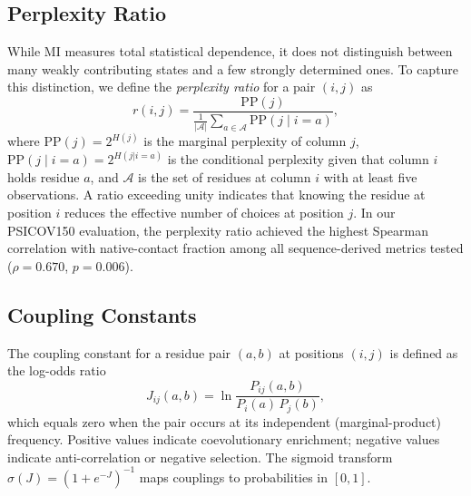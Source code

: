 \subsection{Perplexity Ratio}
\label{sec:perplexity}

While MI measures total statistical dependence, it does not distinguish between
many weakly contributing states and a few strongly determined ones.  To capture
this distinction, we define the \emph{perplexity ratio} for a pair $(i,j)$ as
\begin{equation}
	r(i,j) = \frac{\mathrm{PP}(j)}
	{\frac{1}{|\mathcal{A}|}\sum_{a \in \mathcal{A}}
		\mathrm{PP}(j \mid i = a)},
	\label{eq:pp-ratio}
\end{equation}
where $\mathrm{PP}(j) = 2^{H(j)}$ is the marginal perplexity of column $j$,
$\mathrm{PP}(j \mid i = a) = 2^{H(j|i=a)}$ is the conditional perplexity given
that column $i$ holds residue $a$, and $\mathcal{A}$ is the set of residues at
column $i$ with at least five observations.  A ratio exceeding unity indicates
that knowing the residue at position $i$ reduces the effective number of
choices at position $j$.  In our PSICOV150 evaluation, the perplexity ratio
achieved the highest Spearman correlation with native-contact fraction among
all sequence-derived metrics tested ($\rho = 0.670$, $p = 0.006$).

\subsection{Coupling Constants}
\label{sec:coupling}

The coupling constant for a residue pair $(a, b)$ at positions $(i, j)$ is
defined as the log-odds ratio
\begin{equation}
	J_{ij}(a,b) = \ln \frac{P_{ij}(a,b)}{P_i(a)\,P_j(b)},
	\label{eq:coupling}
\end{equation}
which equals zero when the pair occurs at its independent (marginal-product)
frequency.  Positive values indicate coevolutionary enrichment; negative
values indicate anti-correlation or negative selection.  The sigmoid transform
$\sigma(J) = (1 + e^{-J})^{-1}$ maps couplings to probabilities in $[0, 1]$.
